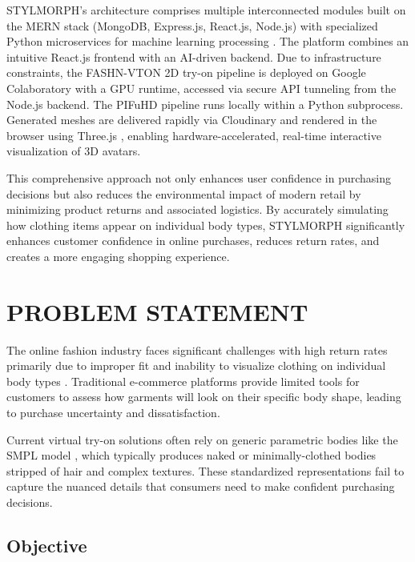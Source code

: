 \documentclass[12pt,a4paper,oneside]{report}
\begin{document}
STYLMORPH's architecture comprises multiple interconnected modules built on the MERN stack (MongoDB, Express.js, React.js, Node.js) with specialized Python microservices for machine learning processing \cite{19}. The platform combines an intuitive React.js frontend with an AI-driven backend. Due to infrastructure constraints, the FASHN-VTON 2D try-on pipeline is deployed on Google Colaboratory with a GPU runtime, accessed via secure API tunneling from the Node.js backend. The PIFuHD pipeline runs locally within a Python subprocess. Generated meshes are delivered rapidly via Cloudinary and rendered in the browser using Three.js \cite{6}, enabling hardware-accelerated, real-time interactive visualization of 3D avatars.

This comprehensive approach not only enhances user confidence in purchasing decisions but also reduces the environmental impact of modern retail by minimizing product returns and associated logistics. By accurately simulating how clothing items appear on individual body types, STYLMORPH significantly enhances customer confidence in online purchases, reduces return rates, and creates a more engaging shopping experience.

\chapter{PROBLEM STATEMENT}

The online fashion industry faces significant challenges with high return rates primarily due to improper fit and inability to visualize clothing on individual body types \cite{5}. Traditional e-commerce platforms provide limited tools for customers to assess how garments will look on their specific body shape, leading to purchase uncertainty and dissatisfaction. 

Current virtual try-on solutions often rely on generic parametric bodies like the SMPL model \cite{2}, which typically produces naked or minimally-clothed bodies stripped of hair and complex textures. These standardized representations fail to capture the nuanced details that consumers need to make confident purchasing decisions.

\section{Objective}
\end{document}
